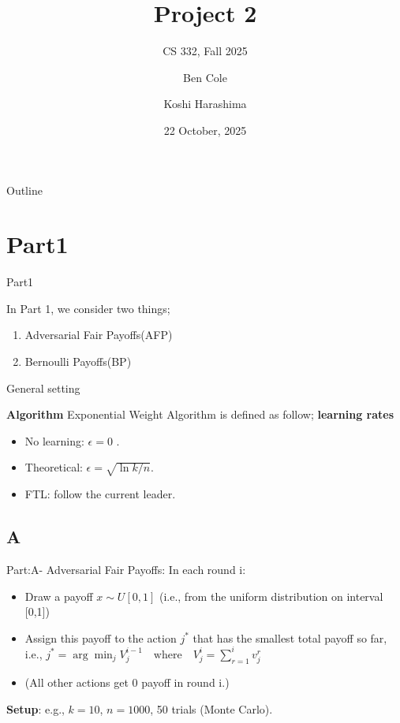 \documentclass{beamer}
\title[Project 2]{Project 2}
\subtitle{CS 332, Fall 2025}
\author{Ben Cole \and Koshi Harashima}
\date{22 October, 2025}
\begin{document}
\maketitle

\begin{frame}{Outline}
  \tableofcontents
\end{frame}

\section{Part1}
\begin{frame}{Part1}

In Part 1, we consider two things;
\begin{enumerate}
    \item Adversarial Fair Payoffs(AFP) 
    \item Bernoulli Payoffs(BP)
\end{enumerate}
\end{frame}

\begin{frame}{General setting}

\textbf{Algorithm}
Exponential Weight Algorithm is defined as follow; 
\textbf{learning rates}
\begin{itemize}
  \item No learning: \(\epsilon = 0\) .
  \item Theoretical: \(\epsilon = \sqrt{\ln k / n}\).
  \item FTL: follow the current leader.
\end{itemize}

\end{frame}

\subsection{A}
\begin{frame}{Part:A- Adversarial Fair Payoffs:}
   In each round i:
\begin{itemize}
    \item Draw a payoff $x \sim U[0,1]$ (i.e., from the uniform distribution on interval [0,1])
    \item Assign this payoff to the action $j^*$ that has the smallest total payoff so far,\\
    i.e., $j^* = \arg\min_j V^{i-1}_{j} \quad \text{where} \quad V^{i}_{j} = \sum_{r=1}^{i} v^{r}_{j}$
    \item (All other actions get 0 payoff in round i.)
\end{itemize} 

\textbf{Setup}: e.g., \(k=10\), \(n=1000\), 50 trials (Monte Carlo).
\end{frame}
\end{document}
